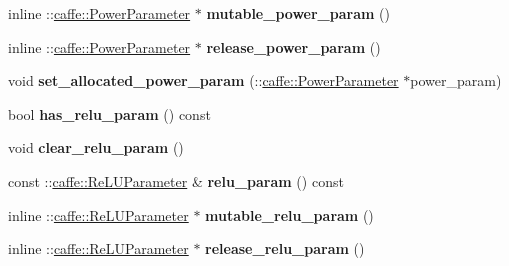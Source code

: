 \begin{DoxyCompactItemize}
\mbox{\label{classcaffe_1_1_v1_layer_parameter_a5b01236bd57dab7a0d88397c3ad2585b}} 
inline \+::\mbox{\hyperlink{classcaffe_1_1_power_parameter}{caffe\+::\+Power\+Parameter}} $\ast$ {\bfseries mutable\+\_\+power\+\_\+param} ()
\item 
\mbox{\label{classcaffe_1_1_v1_layer_parameter_a4ec1834cd56348a1664a0a135e1e9f2e}} 
inline \+::\mbox{\hyperlink{classcaffe_1_1_power_parameter}{caffe\+::\+Power\+Parameter}} $\ast$ {\bfseries release\+\_\+power\+\_\+param} ()
\item 
\mbox{\label{classcaffe_1_1_v1_layer_parameter_a445abb81939e0444a3638a2e633be50a}} 
void {\bfseries set\+\_\+allocated\+\_\+power\+\_\+param} (\+::\mbox{\hyperlink{classcaffe_1_1_power_parameter}{caffe\+::\+Power\+Parameter}} $\ast$power\+\_\+param)
\item 
\mbox{\label{classcaffe_1_1_v1_layer_parameter_ae06c8a3112ae43e7d6c1331a9b905753}} 
bool {\bfseries has\+\_\+relu\+\_\+param} () const
\item 
\mbox{\label{classcaffe_1_1_v1_layer_parameter_a465403643d6e9b35dd35ef9ef4fe8b89}} 
void {\bfseries clear\+\_\+relu\+\_\+param} ()
\item 
\mbox{\label{classcaffe_1_1_v1_layer_parameter_a965aa52b3394b93dda3fde6e8a1398af}} 
const \+::\mbox{\hyperlink{classcaffe_1_1_re_l_u_parameter}{caffe\+::\+Re\+L\+U\+Parameter}} \& {\bfseries relu\+\_\+param} () const
\item 
\mbox{\label{classcaffe_1_1_v1_layer_parameter_a772f05b778bcce296fb81acb24439bd9}} 
inline \+::\mbox{\hyperlink{classcaffe_1_1_re_l_u_parameter}{caffe\+::\+Re\+L\+U\+Parameter}} $\ast$ {\bfseries mutable\+\_\+relu\+\_\+param} ()
\item 
\mbox{\label{classcaffe_1_1_v1_layer_parameter_a45c3f2d22fdbe32342c500d751f911e2}} 
inline \+::\mbox{\hyperlink{classcaffe_1_1_re_l_u_parameter}{caffe\+::\+Re\+L\+U\+Parameter}} $\ast$ {\bfseries release\+\_\+relu\+\_\+param} ()

\end{DoxyCompactItemize}
